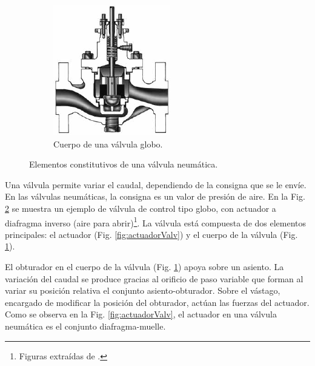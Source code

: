 \begin{figure}[ht]
\begin{subfigure}[b]{0.36\textwidth}
\includegraphics[width=\textwidth]{Cap2-DisenoEnsamblado/images/ValvGlob.pdf}
                \caption{Cuerpo de una válvula globo.}
                \label{fig:cuerpoValv}
        \end{subfigure}
        \caption{Elementos constitutivos de una válvula neumática.}
        \label{fig:elementosValv}
\end{figure}

Una válvula permite variar el caudal, dependiendo de la consigna que se
le envíe.
En las válvulas neumáticas, la consigna es un valor de presión de aire.
En la Fig. \ref{fig:elementosValv} se muestra un ejemplo de válvula de control
tipo globo, con actuador a diafragma inverso (aire para
abrir)\footnote{Figuras extraídas de \cite{bib:controlValveHandbook}.}.
La válvula está compuesta de dos elementos principales: el actuador
(Fig. \ref{fig:actuadorValv}) y el cuerpo de la válvula (Fig.
\ref{fig:cuerpoValv}).

El obturador en el cuerpo de la válvula (Fig. \ref{fig:cuerpoValv}) apoya
sobre un asiento.
La variación del caudal se produce gracias al orificio de paso variable
que forman al variar su posición relativa el conjunto asiento-obturador.
Sobre el vástago, encargado de modificar la posición del obturador,
actúan las fuerzas del actuador.
Como se observa en la Fig. \ref{fig:actuadorValv}, el actuador en una válvula
neumática es el conjunto diafragma-muelle.

